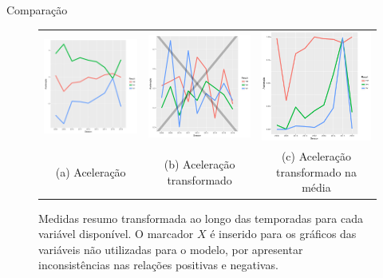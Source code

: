 \documentclass[review]{elsarticle}
\begin{document}
Comparação


\begin{figure}
\begin{tabular}{ccc}
  \includegraphics[width=55mm]{aceleracao_result} & \includegraphics[width=55mm]{aceleracao_result_trans} & \includegraphics[width=55mm]{aceleracao_result_trans_media}\\
\scriptsize{(a) Aceleração } & \scriptsize{(b) Aceleração transformado  } & \scriptsize{(c) Aceleração transformado na média} \\[3pt]

\end{tabular}
    \caption[\scriptsize{Medidas resumo transformado.}]{\scriptsize{Medidas resumo transformada ao longo das temporadas para cada variável disponível. O marcador $X$ é inserido para os gráficos das variáveis não utilizadas para o modelo, por apresentar inconsistências nas relações positivas e negativas.}}
    \label{fig:medresumcomparacao}
\end{figure}
\end{document}
